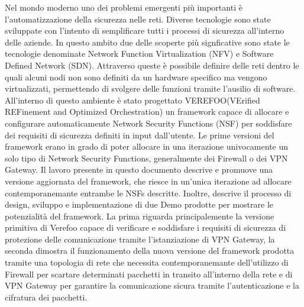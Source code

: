 \sommario


Nel mondo moderno uno dei problemi emergenti più importanti è l'automatizzazione della sicurezza nelle reti. Diverse tecnologie
sono state sviluppate con l'intento di semplificare tutti i processi di sicurezza all'interno delle aziende. In questo ambito due delle scoperte più signficative
sono state le tecnologie denominate Network Function Virtualization (NFV) e Software Defined Network (SDN). Attraverso queste è possibile definire delle reti dentro le quali
alcuni nodi non sono definiti da un hardware specifico ma vengono virtualizzati, permettendo di svolgere delle funzioni tramite l'ausilio di software.
All'interno di questo ambiente è stato progettato VEREFOO(VErified REFinement and Optimized Orchestration) un framework capace di allocare e configurare automaticamente Network Security Functions (NSF)
per soddisfare dei requisiti di sicurezza definiti in input dall'utente. Le prime versioni del framework erano in grado di poter allocare in una iterazione univocamente un solo tipo di Network Security Functions,
generalmente dei Firewall o dei VPN Gateway. Il lavoro presente in questo documento descrive e promuove una versione aggiornata del framework, che riesce in un'unica iterazione ad allocare contemporanemante 
entrambe le NSFs descritte. Inoltre, descrive il processo di design, sviluppo e implementazione di due Demo prodotte per mostrare le potenzialità del framework. La prima riguarda principalemente la versione primitiva
di Verefoo capace di verificare e soddisfare i requisiti di sicurezza di protezione delle comunicazione tramite l'istanziazione di VPN Gateway, la seconda dimostra il funzionamento della nuova versione del framework
prodotta tramite una topologia di rete che necessita contemporanemante dell'utilizzo di Firewall per scartare determinati pacchetti in transito all'interno della rete e di VPN Gateway per garantire la comunicazione sicura tramite l'autenticazione
e la cifratura dei pacchetti.


